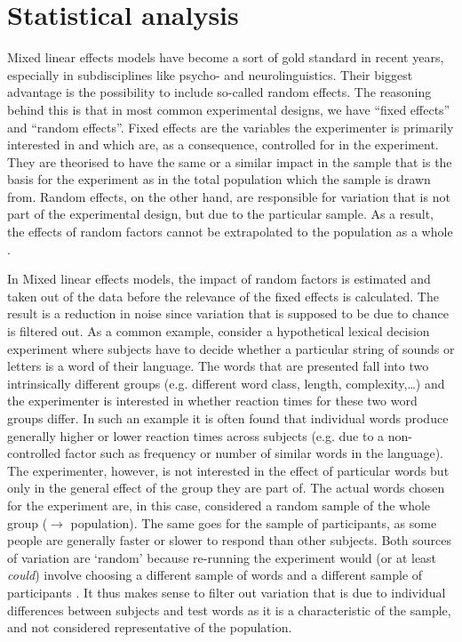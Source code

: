 	\section{Statistical analysis}
	\label{sec.prod_method.stats}

Mixed linear effects models have become a sort of gold standard in recent years, especially in subdisciplines like psycho- and neurolinguistics.
Their biggest advantage is the possibility to include so-called random effects.
The reasoning behind this is that in most common experimental designs, we have ``fixed effects'' and ``random effects''.
Fixed effects are the variables the experimenter is primarily interested in and which are, as a consequence, controlled for in the experiment.
They are theorised to have the same or a similar impact in the sample that is the basis for the experiment as in the total population which the sample is drawn from.
Random effects, on the other hand, are responsible for variation that is not part of the experimental design, but due to the particular sample.
As a result, the effects of random factors cannot be extrapolated to the population as a whole \parencite[cf.][]{barretal2013}.

In Mixed linear effects models, the impact of random factors is estimated and taken out of the data before the relevance of the fixed effects is calculated.
The result is a reduction in noise since variation that is supposed to be due to chance is filtered out.
As a common example, consider a hypothetical lexical decision experiment where subjects have to decide whether a particular string of sounds or letters is a word of their language.
The words that are presented fall into two intrinsically different groups (e.g. different word class, length, complexity,\ldots) and the experimenter is interested in whether reaction times for these two word groups differ.
In such an example it is often found that individual words produce generally higher or lower reaction times across subjects (e.g. due to a non-controlled factor such as frequency or number of similar words in the language).
The experimenter, however, is not interested in the effect of particular words but only in the general effect of the group they are part of.
The actual words chosen for the experiment are, in this case, considered a random sample of the whole group (\(\rightarrow\) population).
The same goes for the sample of participants, as some people are generally faster or slower to respond than other subjects.
Both sources of variation are `random' because re-running the experiment would (or at least \emph{could}) involve choosing a different sample of words and a different sample of participants \parencite[cf.][259--260]{barretal2013}.
It thus makes sense to filter out variation that is due to individual differences between subjects and test words as it is a characteristic of the sample, and not considered representative of the population.

